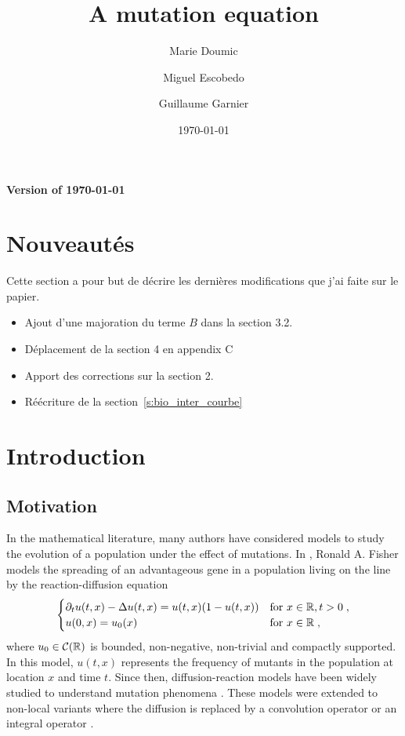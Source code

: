 \documentclass[11pt]{amsart}
\title{A mutation equation}
\author{Marie Doumic \and Miguel Escobedo \and Guillaume Garnier}
\date{\today}
\begin{document}
\maketitle
\begin{center}
    \textbf{Version of \today}
\end{center}

\tableofcontents

\section*{Nouveautés}
Cette section a pour but de décrire les dernières modifications que j'ai faite sur le papier.

\begin{itemize}
    \item Ajout d'une majoration du terme $B$ dans la section 3.2.
    \item Déplacement de la section 4 en appendix C 
    \item Apport des corrections sur la section 2. 
    \item Réécriture de la section~\ref{s:bio_inter_courbe}
\end{itemize}

\section{Introduction}

\subsection{Motivation} \mbox{}

In the mathematical literature, many authors have considered models to study the evolution of a population under the effect of mutations. In \cite{fisher1937wave}, Ronald A. Fisher models the spreading of an advantageous gene in a population living on the line by the reaction-diffusion equation
    \begin{equation*}
        \begin{cases}
            \partial_t u(t,x) - \Delta u(t,x) = u(t,x)(1-u(t,x)) & \text{for } x \in \mathbb{R},  t > 0
            \; ,
            \\
            u(0, x) = u_0(x)     & \text{for } x \in \mathbb{R} \; ,
        \end{cases}
    \end{equation*} 
where $u_0 \in \mathcal{C}(\mathbb{R})$ is bounded, non-negative, non-trivial and compactly supported. 
In this model, $u(t,x)$ represents the frequency of mutants in the population at location $x$ and time $t$.
Since then, diffusion-reaction models have been widely studied to understand mutation phenomena \cite{fife1979mathematical, lam2022introduction}. 
These models were extended to non-local variants where the diffusion is replaced by a convolution operator \cite{coville2007non} or an integral operator \cite{burger1996stationary,bonnefon2017concentration, alfaro2023confining}.
\end{document}
